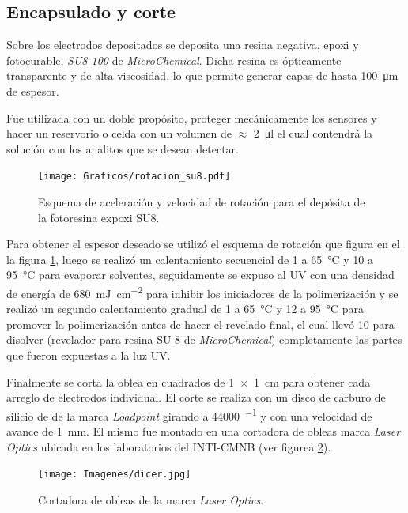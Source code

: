 	\subsection{Encapsulado y corte}\label{sec:corte}

		Sobre los electrodos depositados se deposita una resina negativa, epoxi y fotocurable, \textit{SU8-100} de \textit{MicroChemical}\cite{MicrochemicalsTeam2009}. Dicha resina es ópticamente transparente y de alta viscosidad, lo que permite generar capas de hasta \SI{100}{\um} de espesor. 

		Fue utilizada con un doble propósito, proteger mecánicamente los sensores y hacer un reservorio o celda con un volumen de $\approx$ \SI{2}{\ul} el cual contendrá la solución con los analitos que se desean detectar.  
			\begin{figure}[ht]
			 		  \begin{center}
			 		  \texttt{[image: Graficos/rotacion\_su8.pdf]}
			 		  \caption[Parámetros de depósito para la resina expoxi]{Esquema de aceleración y velocidad de rotación para el depósita de la fotoresina expoxi SU8.}
			 		  \label{fig:spin-su8}
			 		  \end{center}
			 		  \end{figure}
	
		Para obtener el espesor deseado se utilizó el esquema de rotación que figura en el la figura \ref{fig:spin-su8}, luego se realizó un calentamiento secuencial de \SI{1}{\min} a \SI{65}{\celsius} y \SI{10}{\min} a \SI{95}{\celsius} para evaporar solventes, seguidamente se expuso al UV con una densidad de energía de \SI{680}{mJ.cm^{-2}} para inhibir los iniciadores de la polimerización y se realizó un segundo calentamiento gradual de \SI{1}{\min} a \SI{65}{\celsius} y \SI{12}{\min} a \SI{95}{\celsius} para promover la polimerización antes de hacer el revelado final, el cual llevó \SI{10}{\min} para disolver (revelador para resina SU-8 de \textit{MicroChemical}) completamente las partes que fueron expuestas a la luz UV. 
		
		Finalmente se corta la oblea en cuadrados de \SI{1x1}{\cm} para obtener cada arreglo de electrodos individual. El corte se realiza con un disco de carburo de silicio de  de la marca \textit{Loadpoint} girando a \SI{44000}{\min^{-1}} y con una velocidad de avance de \SI{1}{\mm}. El mismo fue montado en una cortadora de obleas marca \textit{Laser Optics} ubicada en los laboratorios del INTI-CMNB (ver figurea \ref{fig:dicer}).
			\begin{figure}[ht]
			 		  \begin{center}
			 		  \texttt{[image: Imagenes/dicer.jpg]}
			 		  \caption[Cortadora de obleas]{Cortadora de obleas de la marca \textit{Laser Optics}.}
			 		  \label{fig:dicer}
			 		  \end{center}
			 		  \end{figure}
			

